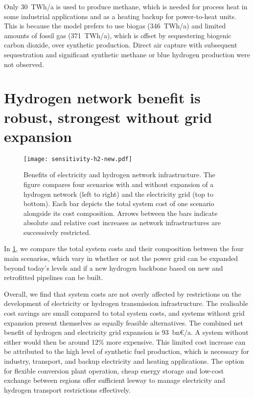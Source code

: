 Only 30~TWh/a is used to produce methane, which is needed for process heat in
some industrial applications and as a heating backup for power-to-heat units.
This is because the model prefers to use biogas (346~TWh/a) and limited amounts
of fossil gas (371~TWh/a), which is offset by sequestering biogenic carbon
dioxide, over synthetic production. Direct air capture with subsequent
sequestration and significant synthetic methane or blue hydrogen production were
not observed.

\section*{Hydrogen network benefit is robust, strongest without grid expansion}
\label{sec:h2}

\begin{figure}
    \centering
    \texttt{[image: sensitivity-h2-new.pdf]}
    \caption{Benefits of electricity and hydrogen network infrastructure. The
    figure compares four scenarios with and without expansion of a hydrogen
    network (left to right) and the electricity grid (top to bottom). Each bar
    depicts the total system cost of one scenario alongside its cost
    composition. Arrows between the bars indicate absolute and relative cost
    increases as network infrastructures are successively restricted.}
    \label{fig:sensitivity-h2}
\end{figure}

In \cref{fig:sensitivity-h2}, we compare the total system costs and their
composition between the four main scenarios, which vary in whether or not the
power grid can be expanded beyond today's levels and if a new hydrogen backbone
based on new and retrofitted pipelines can be built.


Overall, we find that system costs are not overly affected by restrictions on
the development of electricity or hydrogen transmission infrastructure. The
realisable cost savings are small compared to total system costs, and systems
without grid expansion present themselves as equally feasible alternatives. The
combined net benefit of hydrogen and electricity grid expansion is 93~bn\euro/a.
A system without either would then be around 12\% more expensive. This limited
cost increase can be attributed to the high level of synthetic fuel production,
which is necessary for industry, transport, and backup electricity and heating
applications. The option for flexible conversion plant operation, cheap energy
storage and low-cost exchange between regions offer sufficient leeway to manage
electricity and hydrogen transport restrictions effectively.

